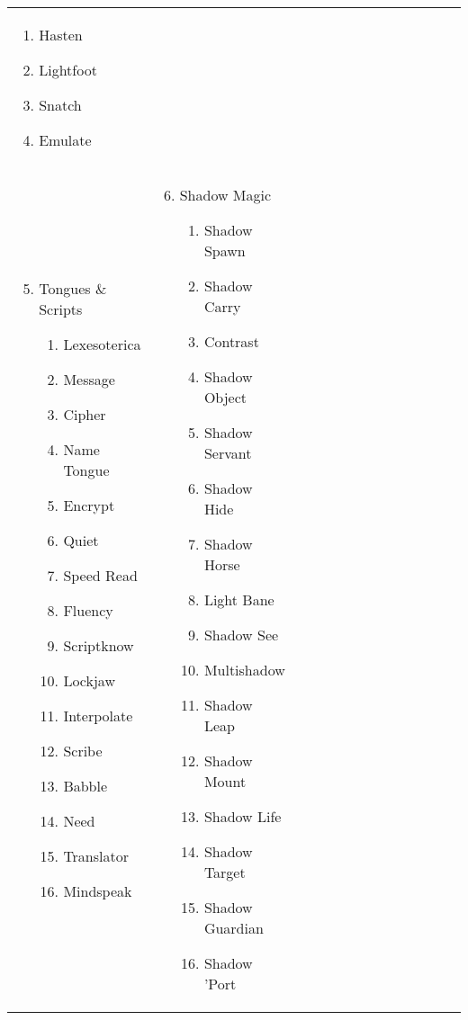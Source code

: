 \begin{tabular}{@{} p{0.25\linewidth} p{0.25\linewidth} p{0.25\linewidth} p{0.25\linewidth}}
\begin{enumerate}
\begin{enumerate}
		\item Hasten
		\item Lightfoot
		\item Snatch
		\item Emulate
	\end{enumerate}
\end{enumerate} \\
\begin{enumerate}
	\setcounter{enumi}{4}
	\item Tongues \& Scripts
	\begin{enumerate}
		\item Lexesoterica
		\item Message
		\item Cipher
		\item Name Tongue
		\item Encrypt
		\item Quiet
		\item Speed Read
		\item Fluency
		\item Scriptknow
		\item Lockjaw
		\item Interpolate
		\item Scribe
		\item Babble
		\item Need
		\item Translator
		\item Mindspeak
	\end{enumerate}
\end{enumerate} &
\begin{enumerate}
	\setcounter{enumi}{5}
	\item Shadow Magic
	\begin{enumerate}
		\item Shadow Spawn
		\item Shadow Carry
		\item Contrast
		\item Shadow Object
		\item Shadow Servant
		\item Shadow Hide
		\item Shadow Horse
		\item Light Bane
		\item Shadow See
		\item Multishadow
		\item Shadow Leap
		\item Shadow Mount
		\item Shadow Life
		\item Shadow Target
		\item Shadow Guardian
		\item Shadow 'Port
	\end{enumerate}
\end{enumerate}
\end{tabular}
\pagebreak

